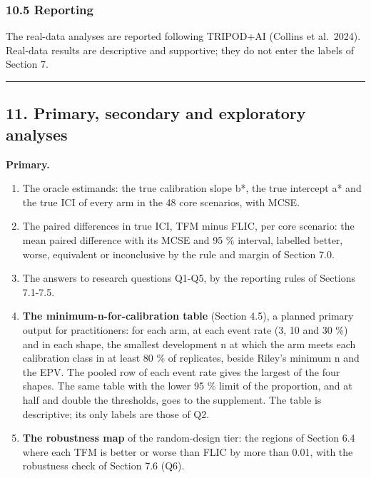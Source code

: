 \documentclass[
  10pt,
]{article}
\providecommand{\tightlist}{%
  \setlength{\itemsep}{0pt}\setlength{\parskip}{0pt}}
\begin{document}
\subsubsection{10.5 Reporting}\label{reporting}

The real-data analyses are reported following TRIPOD+AI
(Collins et al.~2024). Real-data results are descriptive and
supportive; they do not enter the labels of Section 7.

\begin{center}\rule{0.5\linewidth}{0.5pt}\end{center}

\subsection{11. Primary, secondary and exploratory
analyses}\label{primary-secondary-and-exploratory-analyses}

\textbf{Primary.}

\begin{enumerate}
\def\labelenumi{\arabic{enumi}.}
\tightlist
\item
  The oracle estimands: the true calibration slope b*, the
  true intercept a* and the true ICI of every arm in the 48
  core scenarios, with MCSE.
\item
  The paired differences in true ICI, TFM minus FLIC, per
  core scenario: the mean paired difference with its MCSE
  and 95 \% interval, labelled better, worse, equivalent or
  inconclusive by the rule and margin of Section 7.0.
\item
  The answers to research questions Q1-Q5, by the reporting
  rules of Sections 7.1-7.5.
\item
  \textbf{The minimum-n-for-calibration table} (Section
  4.5), a planned primary output for practitioners: for each
  arm, at each event rate (3, 10 and 30 \%) and in each
  shape, the smallest development n at which the arm meets
  each calibration class in at least 80 \% of replicates,
  beside Riley's minimum n and the EPV. The pooled row of
  each event rate gives the largest of the four shapes. The
  same table with the lower 95 \% limit of the proportion,
  and at half and double the thresholds, goes to the
  supplement. The table is descriptive; its only labels are
  those of Q2.
\item
  \textbf{The robustness map} of the random-design tier: the
  regions of Section 6.4 where each TFM is better or worse
  than FLIC by more than 0.01, with the robustness check of
  Section 7.6 (Q6).
\end{enumerate}
\end{document}
